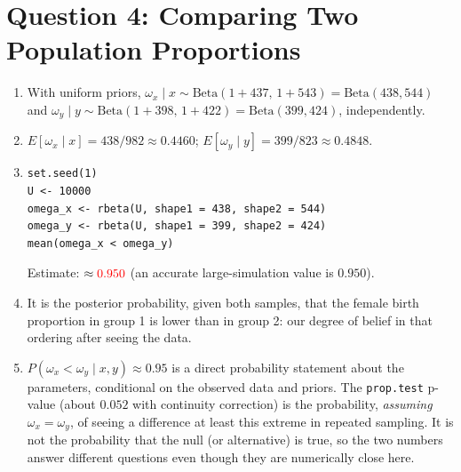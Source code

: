 \documentclass[11pt]{article}
\newcommand{\chk}[1]{{\color{red}#1}}%
\begin{document}
\section*{Question 4: Comparing Two Population Proportions}
\begin{enumerate}
\item With uniform priors, $\omega_x\mid x\sim\mathrm{Beta}(1+437,\,1+543)=\mathrm{Beta}(438,544)$ and $\omega_y\mid y\sim\mathrm{Beta}(1+398,\,1+422)=\mathrm{Beta}(399,424)$, independently.
\item $E[\omega_x\mid x]=438/982\approx0.4460$; $E[\omega_y\mid y]=399/823\approx0.4848$.
\item \begin{lstlisting}
set.seed(1)
U <- 10000
omega_x <- rbeta(U, shape1 = 438, shape2 = 544)
omega_y <- rbeta(U, shape1 = 399, shape2 = 424)
mean(omega_x < omega_y)
\end{lstlisting}
Estimate: $\approx\chk{0.950}$ (an accurate large-simulation value is $0.950$).
\item It is the posterior probability, given both samples, that the female birth proportion in group 1 is lower than in group 2: our degree of belief in that ordering after seeing the data.
\item $P(\omega_x<\omega_y\mid x,y)\approx0.95$ is a direct probability statement about the parameters, conditional on the observed data and priors. The \texttt{prop.test} p-value (about $0.052$ with continuity correction) is the probability, \emph{assuming} $\omega_x=\omega_y$, of seeing a difference at least this extreme in repeated sampling. It is not the probability that the null (or alternative) is true, so the two numbers answer different questions even though they are numerically close here.
\end{enumerate}

\end{document}
